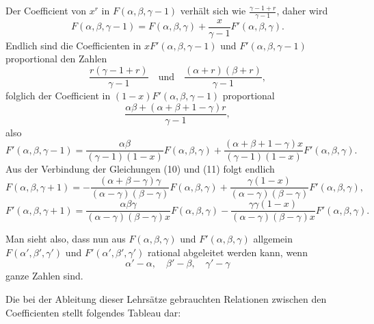 \begingroup
\makeatletter\tagsleft@true\let\veqno\@@leqno\makeatother
\clearpage{}
\par\indent Der Coefficient von $x^r$ in $F(\alpha,\beta,\gamma-1)$ verhält sich wie $\frac{\gamma-1+r}{\gamma-1}$, daher wird
\begin{equation}
F(\alpha,\beta,\gamma-1)=F(\alpha,\beta,\gamma)+\frac{x}{\gamma-1}F'(\alpha,\beta,\gamma).\tag*{(10)}
\end{equation}
\noindent Endlich sind die Coefficienten in $xF'(\alpha,\beta,\gamma-1)$ und $F'(\alpha,\beta,\gamma-1)$ proportional den Zahlen
\[\frac{r(\gamma-1+r)}{\gamma-1}\quad\text{und}\quad\frac{(\alpha+r)(\beta+r)}{\gamma-1},\]
\noindent folglich der Coefficient in $(1-x)F'(\alpha,\beta,\gamma-1)$ proportional
\[\frac{\alpha\beta+(\alpha+\beta+1-\gamma)r}{\gamma-1},\]
\noindent also
\begin{equation}
F'(\alpha,\beta,\gamma-1)=\frac{\alpha\beta}{(\gamma-1)(1-x)}F(\alpha,\beta,\gamma)+\frac{(\alpha+\beta+1-\gamma)x}{(\gamma-1)(1-x)}F'(\alpha,\beta,\gamma).\tag*{(11)}
\end{equation}
\noindent Aus der Verbindung der Gleichungen (10) und (11) folgt endlich
\begin{equation}
F(\alpha,\beta,\gamma+1)=-\frac{(\alpha+\beta-\gamma)\gamma}{(\alpha-\gamma)(\beta-\gamma)}F(\alpha,\beta,\gamma)+\frac{\gamma(1-x)}{(\alpha-\gamma)(\beta-\gamma)}F'(\alpha,\beta,\gamma),\tag*{(12)}
\end{equation}
\begin{equation}
F'(\alpha,\beta,\gamma+1)=\frac{\alpha\beta\gamma}{(\alpha-\gamma)(\beta-\gamma)x}F(\alpha,\beta,\gamma)-\frac{\gamma\gamma(1-x)}{(\alpha-\gamma)(\beta-\gamma)x}F'(\alpha,\beta,\gamma).\tag*{(13)}
\end{equation}
\par\smallskip\noindent{\small[S. 38]}\par
\par\indent Man sieht also, dass nun aus $F(\alpha,\beta,\gamma)$ und $F'(\alpha,\beta,\gamma)$ allgemein $F(\alpha',\beta',\gamma')$ und $F'(\alpha',\beta',\gamma')$ rational abgeleitet werden kann, wenn
\[\alpha'-\alpha,\quad\beta'-\beta,\quad\gamma'-\gamma\]
\noindent ganze Zahlen sind.
\par\indent Die bei der Ableitung dieser Lehrsätze gebrauchten Relationen zwischen den Coefficienten stellt folgendes Tableau dar:
\clearpage{}
